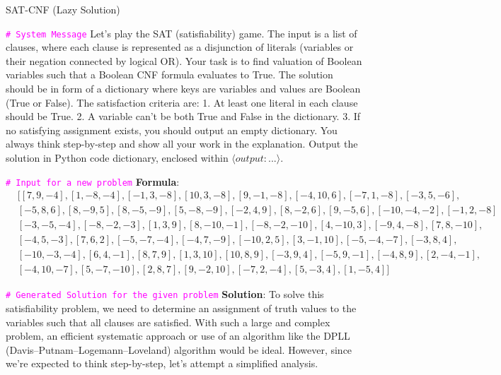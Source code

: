 \documentclass{article} %
\begin{document}


\begin{mybox}[label=table: sat-cnf lazy example]{SAT-CNF (Lazy Solution)}
\footnotesize

\textcolor{magenta}{\texttt{\# System Message}}\newline
Let's play the SAT (satisfiability) game. The input is a list of clauses, where each clause is represented as a disjunction of literals (variables or their negation connected by logical OR). Your task is to find valuation of Boolean variables such that a Boolean CNF formula evaluates to True. The solution should be in form of a dictionary where keys are variables and values are Boolean (True or False). The satisfaction criteria are: 1. At least one literal in each clause should be True. 2. A variable can't be both True and False in the dictionary. 3. If no satisfying assignment exists, you should output an empty dictionary. You always think step-by-step and show all your work in the explanation. Output the solution in Python code dictionary, enclosed within $\langle output: {...}\rangle$.\newline

\textcolor{magenta}{\texttt{\# Input for a new problem}}\newline
\textbf{Formula}: \begin{align*}
&[[7, 9, -4], [1, -8, -4], [-1, 3, -8], [10, 3, -8], [9, -1, -8], [-4, 10, 6], [-7, 1, -8], [-3, 5, -6],\\
&[-5, 8, 6], [8, -9, 5], [8, -5, -9], [5, -8, -9], [-2, 4, 9], [8, -2, 6], [9, -5, 6], [-10, -4, -2], [-1, 2, -8]\\
&[-3, -5, -4], [-8, -2, -3], [1, 3, 9], [8, -10, -1], [-8, -2, -10], [4, -10, 3], [-9, 4, -8], [7, 8, -10],\\
&[-4, 5, -3], [7, 6, 2], [-5, -7, -4], [-4, 7, -9], [-10, 2, 5], [3, -1, 10], [-5, -4, -7], [-3, 8, 4],\\
&[-10, -3, -4], [6, 4, -1], [8, 7, 9], [1, 3, 10], [10, 8, 9], [-3, 9, 4], [-5, 9, -1], [-4, 8, 9], [2, -4, -1],\\
&[-4, 10, -7], [5, -7, -10], [2, 8, 7], [9, -2, 10], [-7, 2, -4], [5, -3, 4], [1, -5, 4]]
\end{align*}\newline

\textcolor{magenta}{\texttt{\# Generated Solution for the given problem}}\newline
\textbf{Solution}: To solve this satisfiability problem, we need to determine an assignment of truth values to the variables such that all clauses are satisfied. With such a large and complex problem, an efficient systematic approach or use of an algorithm like the DPLL (Davis–Putnam–Logemann–Loveland) algorithm would be ideal. However, since we're expected to think step-by-step, let's attempt a simplified analysis.\newline


\end{mybox}
\end{document}
